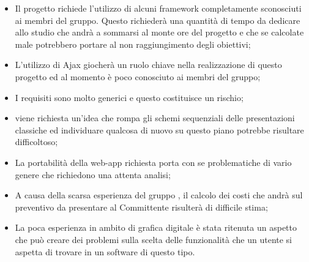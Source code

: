 \begin{itemize}
	\item Il progetto \PROGETTO{} richiede l'utilizzo di alcuni framework completamente sconosciuti ai membri del gruppo. Questo richiederà una quantità di tempo da dedicare allo studio che andrà a sommarsi al monte ore del progetto e che se calcolate male potrebbero portare al non raggiungimento degli obiettivi;
	\item L'utilizzo di Ajax giocherà un ruolo chiave nella realizzazione di questo progetto ed al momento è poco conosciuto ai membri del gruppo;
	\item I requisiti sono molto generici e questo costituisce un rischio;
	\item viene richiesta un'idea che rompa gli schemi sequenziali delle presentazioni classiche ed individuare qualcosa di nuovo su questo piano potrebbe risultare difficoltoso;
	\item La portabilità della web-app richiesta porta con se problematiche di vario genere che richiedono una attenta analisi;
	\item A causa della scarsa esperienza del gruppo \GRUPPO, il calcolo dei costi che andrà sul preventivo da presentare al Committente risulterà di difficile stima;
	\item La poca esperienza in ambito di grafica digitale è stata ritenuta un aspetto che può creare dei problemi sulla scelta delle funzionalità che un utente si aspetta di trovare in un software di questo tipo.
\end{itemize}
